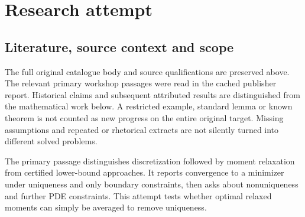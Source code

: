 \documentclass[11pt]{article}
\begin{document}
\section{Research attempt}
\subsection{Literature, source context and scope}
The full original catalogue body and source qualifications are preserved above. The relevant primary workshop passages were read in the cached publisher report. Historical claims and subsequent attributed results are distinguished from the mathematical work below. A restricted example, standard lemma or known theorem is not counted as new progress on the entire original target. Missing assumptions and repeated or rhetorical extracts are not silently turned into different solved problems.

The primary passage distinguishes discretization followed by moment relaxation from certified lower-bound approaches. It reports convergence to a minimizer under uniqueness and only boundary constraints, then asks about nonuniqueness and further PDE constraints. This attempt tests whether optimal relaxed moments can simply be averaged to remove uniqueness.
\end{document}
